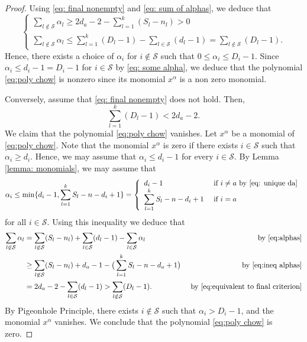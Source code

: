 \documentclass[10pt,a4paper]{amsart}
\begin{document}
\begin{proof}
\noindent Using \eqref{eq: final nonempty} and \eqref{eq: sum of alphas}, we deduce that
    \begin{equation*}
    \left\{\begin{array}{ll}
    \displaystyle\sum_{l\notin\mathcal S}\alpha_l\ge2d_a-2-\sum_{l=1}^k(S_l-n_l)>0\\
        \displaystyle\sum_{l\not\in\mathcal S}\alpha_l\le\sum_{l=1}^k(D_l-1)-\sum_{l\in\mathcal S}(d_l-1)=\sum_{l\notin\mathcal S}(D_l-1).
    \end{array}\right.
    \end{equation*}
    Hence, there exists a choice of $\alpha_i$ for $i\not\in\mathcal S$ such that $0\leq\alpha_i\leq D_i-1$. Since $\alpha_i\leq d_i-1=D_i-1$ for $i\in\mathcal S$ by \eqref{eq: some alpha}, we deduce that the polynomial \eqref{eq:poly chow} is nonzero since its monomial $x^\alpha$ is a non zero monomial.

Conversely, assume that \eqref{eq: final nonempty} does not hold. Then, \begin{equation}\label{eq:equivalent to final criterion}
        \displaystyle\sum_{l=1}^k(D_l-1)<2d_a-2.
    \end{equation}
    We claim that the polynomial \eqref{eq:poly chow} vanishes. Let $x^\alpha$ be a monomial of \eqref{eq:poly chow}.
    Note that the monomial $x^\alpha$ is zero if there exists $i\in\mathcal S$ such that $\alpha_i\ge d_i$. Hence, we may assume that $\alpha_i\leq d_i-1$ for every $i\in\mathcal S$. By Lemma \ref{lemma: monomials}, we may assume that 
    \begin{equation}\label{eq:ineq alphas}
    \alpha_i\leq \min\{d_i-1,\sum_{l=1}^k S_l-n-d_i+1\}=\left\{\begin{array}{ll}
             d_i-1&\text{ if }i\ne a\text{ by \eqref{eq: unique da}}\\
             \displaystyle\sum_{l=1}^k S_l-n-d_i+1&\text{ if }i=a
        \end{array}\right.
    \end{equation}
    for all $i\in\mathcal S$. Using this inequality we deduce that 
    \begin{align*}
        \sum_{l\not\in\mathcal S}\alpha_l&=\sum_{l\not\in\mathcal S} (S_l-n_l)+\sum_{l\in\mathcal S}(d_l-1)-\sum_{l\in\mathcal S}\alpha_l&\text{ by \eqref{eq:alphas}}\\
        &\geq \sum_{l\not\in\mathcal S} (S_l-n_l)+d_a-1-\big(\sum_{l=1}^kS_l-n-d_a+1\big)&\text{ by \eqref{eq:ineq alphas}}\\
        &=2d_a-2-\sum_{l\in\mathcal S}(d_l-1)>\sum_{l\notin\mathcal S}(D_l-1).&\text{ by \eqref{eq:equivalent to final criterion}}
    \end{align*}
    By Pigeonhole Principle, there exists $i\not\in\mathcal S$ such that $\alpha_i>D_i-1$, and the monomial $x^\alpha$ vanishes. We conclude that the polynomial \eqref{eq:poly chow} is zero.
\end{proof}
\end{document}
